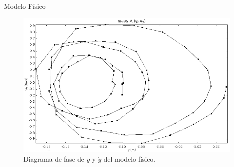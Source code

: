 \documentclass{beamer}
\begin{document}
\begin{frame}{Modelo Físico}
 \begin{figure}[h]
 \centering
 \includegraphics[scale=0.2]{../Report/img/tracker_poc_phasediagram_y_vy.png}
 \caption{Diagrama de fase de $y$ y $\dot{y}$ del modelo físico.}
 \label{fig: tracker phase diagram y vy}
\end{figure}

\end{frame}
\end{document}
